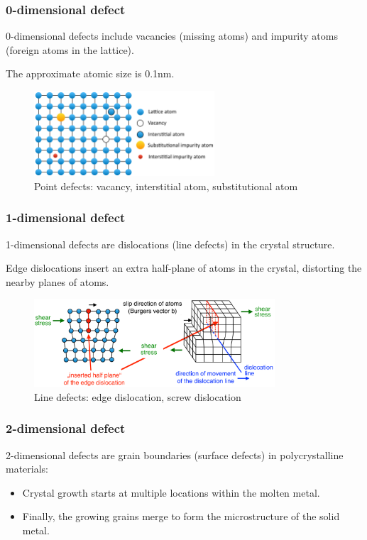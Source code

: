 \documentclass{article}
\begin{document}
\subsubsection{0-dimensional defect}
0-dimensional defects include vacancies (missing atoms) and impurity atoms (foreign atoms in the lattice).

The approximate atomic size is 0.1nm.

\begin{figure}[ht!]
  \centering
  \includegraphics[width=0.6\textwidth]{media/lattice_0d.png}
  \caption*{Point defects: vacancy, interstitial atom, substitutional atom}
\end{figure}

\newpage
\subsubsection{1-dimensional defect}
1-dimensional defects are dislocations (line defects) in the crystal structure.

Edge dislocations insert an extra half-plane of atoms in the crystal,
distorting the nearby planes of atoms.

\begin{figure}[ht!]
  \centering
  \includegraphics[width=0.8\textwidth]{media/lattice_1d.png}
  \caption*{Line defects: edge dislocation, screw dislocation}
\end{figure}

\subsubsection{2-dimensional defect}
2-dimensional defects are grain boundaries (surface defects) in polycrystalline materials:
\begin{itemize}
  \item Crystal growth starts at multiple locations within the molten metal.
  \item Finally, the growing grains merge to form the microstructure of the solid metal.
\end{itemize}
\end{document}
